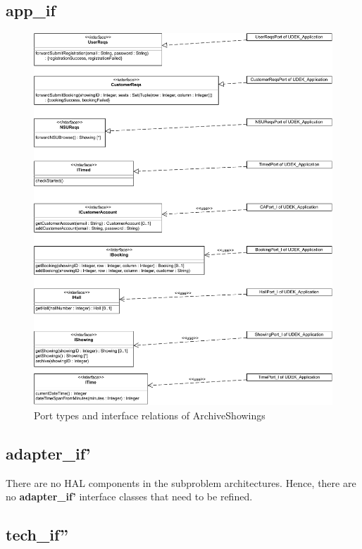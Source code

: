 \documentclass[a4paper,10pt,titlepage,bibtotoc,bibtotocnumbered]{scrreprt}
\begin{document}
\subsection*{app\_if}
\begin{figure}[H]
    \centering
    \includegraphics[width = \textwidth]{figures/08/A08_app_if.pdf}
    \caption{Port types and interface relations of ArchiveShowings}
    \label{figure:app_if}
\end{figure}

\subsection*{adapter\_if'}

There are no HAL components in the subproblem architectures. Hence, there are no \textbf{adapter\_if'} interface classes that need to be refined.

\subsection*{tech\_if''}
\end{document}
